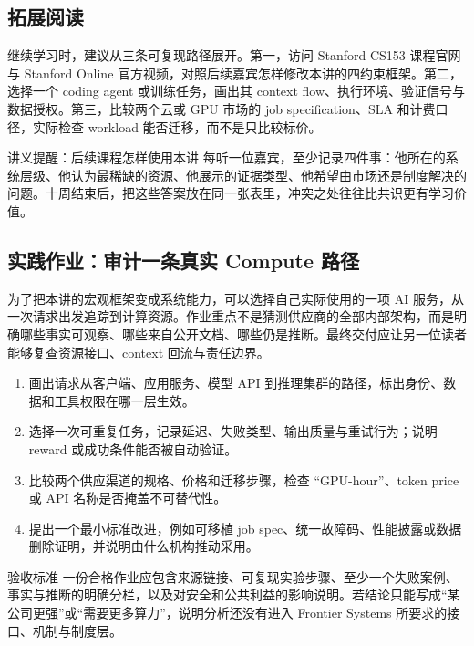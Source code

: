 \subsection{拓展阅读}

继续学习时，建议从三条可复现路径展开。第一，访问 Stanford CS153 课程官网与 Stanford Online 官方视频，对照后续嘉宾怎样修改本讲的四约束框架。第二，选择一个 coding agent 或训练任务，画出其 context flow、执行环境、验证信号与数据授权。第三，比较两个云或 GPU 市场的 job specification、SLA 和计费口径，实际检查 workload 能否迁移，而不是只比较标价。

\begin{knowledgebox}{讲义提醒：后续课程怎样使用本讲}
每听一位嘉宾，至少记录四件事：他所在的系统层级、他认为最稀缺的资源、他展示的证据类型、他希望由市场还是制度解决的问题。十周结束后，把这些答案放在同一张表里，冲突之处往往比共识更有学习价值。
\end{knowledgebox}

\subsection{实践作业：审计一条真实 Compute 路径}

为了把本讲的宏观框架变成系统能力，可以选择自己实际使用的一项 AI 服务，从一次请求出发追踪到计算资源。作业重点不是猜测供应商的全部内部架构，而是明确哪些事实可观察、哪些来自公开文档、哪些仍是推断。最终交付应让另一位读者能够复查资源接口、context 回流与责任边界。

\begin{enumerate}
  \item 画出请求从客户端、应用服务、模型 API 到推理集群的路径，标出身份、数据和工具权限在哪一层生效。
  \item 选择一次可重复任务，记录延迟、失败类型、输出质量与重试行为；说明 reward 或成功条件能否被自动验证。
  \item 比较两个供应渠道的规格、价格和迁移步骤，检查 ``GPU-hour''、token price 或 API 名称是否掩盖不可替代性。
  \item 提出一个最小标准改进，例如可移植 job spec、统一故障码、性能披露或数据删除证明，并说明由什么机构推动采用。
\end{enumerate}

\begin{importantbox}{验收标准}
一份合格作业应包含来源链接、可复现实验步骤、至少一个失败案例、事实与推断的明确分栏，以及对安全和公共利益的影响说明。若结论只能写成“某公司更强”或“需要更多算力”，说明分析还没有进入 Frontier Systems 所要求的接口、机制与制度层。
\end{importantbox}


